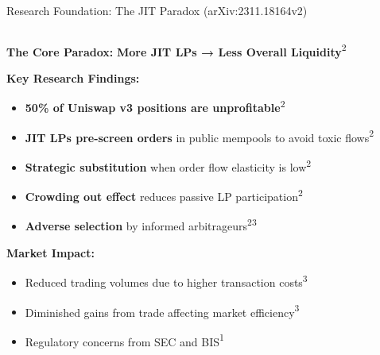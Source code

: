 \documentclass[aspectratio=169]{beamer}
\newcommand{\citeaquilina}{\textcolor{parityblue}{\textsuperscript{1}}}
\newcommand{\citecapponi}{\textcolor{paritygreen}{\textsuperscript{2}}}
\newcommand{\citema}{\textcolor{parityorange}{\textsuperscript{3}}}
\begin{document}
\begin{frame}{Research Foundation: The JIT Paradox (arXiv:2311.18164v2)}
    \begin{columns}
        \begin{column}{0.6\textwidth}
            \textbf{The Core Paradox:}
            \textcolor{parityred}{\Large \textbf{More JIT LPs → Less Overall Liquidity}}\citecapponi
            
            \vspace{0.5cm}
            \textbf{Key Research Findings:}
            \begin{itemize}
                \item \textcolor{parityred}{\textbf{50\% of Uniswap v3 positions are unprofitable}}\citecapponi
                \item \textcolor{parityred}{\textbf{JIT LPs pre-screen orders}} in public mempools to avoid toxic flows\citecapponi
                \item \textcolor{parityred}{\textbf{Strategic substitution}} when order flow elasticity is low\citecapponi
                \item \textcolor{parityred}{\textbf{Crowding out effect}} reduces passive LP participation\citecapponi
                \item \textcolor{parityred}{\textbf{Adverse selection}} by informed arbitrageurs\citecapponi\citema
            \end{itemize}
            
            \vspace{0.5cm}
            \textbf{Market Impact:}
            \begin{itemize}
                \item Reduced trading volumes due to higher transaction costs\citema
                \item Diminished gains from trade affecting market efficiency\citema
                \item Regulatory concerns from SEC and BIS\citeaquilina
            \end{itemize}
        \end{column}
        \begin{column}{0.4\textwidth}
\end{column}
\end{columns}
\end{frame}
\end{document}
